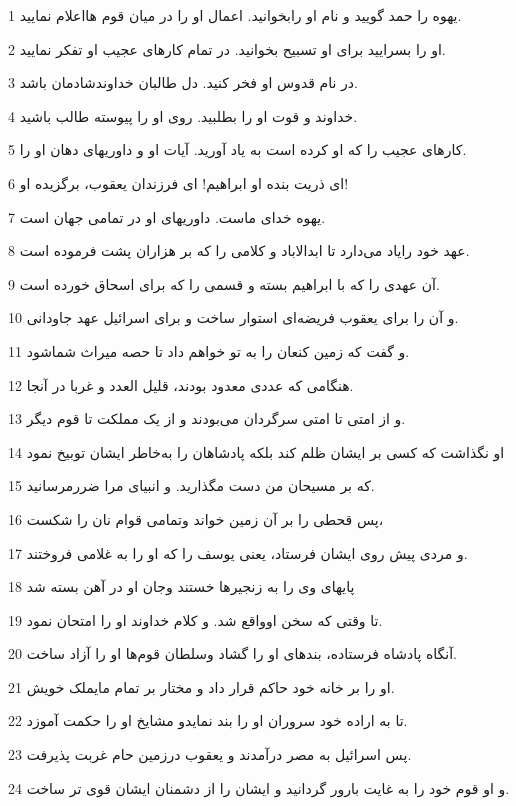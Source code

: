 \par 1 یهوه را حمد گویید و نام او رابخوانید. اعمال او را در میان قوم هااعلام نمایید.
\par 2 او را بسرایید برای او تسبیح بخوانید. در تمام کارهای عجیب او تفکر نمایید.
\par 3 در نام قدوس او فخر کنید. دل طالبان خداوندشادمان باشد.
\par 4 خداوند و قوت او را بطلبید. روی او را پیوسته طالب باشید.
\par 5 کارهای عجیب را که او کرده است به یاد آورید. آیات او و داوریهای دهان او را.
\par 6 ‌ای ذریت بنده او ابراهیم! ای فرزندان یعقوب، برگزیده او!
\par 7 یهوه خدای ماست. داوریهای او در تمامی جهان است.
\par 8 عهد خود رایاد می‌دارد تا ابدالاباد و کلامی را که بر هزاران پشت فرموده است.
\par 9 آن عهدی را که با ابراهیم بسته و قسمی را که برای اسحاق خورده است.
\par 10 و آن را برای یعقوب فریضه‌ای استوار ساخت و برای اسرائیل عهد جاودانی.
\par 11 و گفت که زمین کنعان را به تو خواهم داد تا حصه میراث شماشود.
\par 12 هنگامی که عددی معدود بودند، قلیل العدد و غربا در آنجا.
\par 13 و از امتی تا امتی سرگردان می‌بودند و از یک مملکت تا قوم دیگر.
\par 14 او نگذاشت که کسی بر ایشان ظلم کند بلکه پادشاهان را به‌خاطر ایشان توبیخ نمود
\par 15 که بر مسیحان من دست مگذارید. و انبیای مرا ضررمرسانید.
\par 16 پس قحطی را بر آن زمین خواند وتمامی قوام نان را شکست،
\par 17 و مردی پیش روی ایشان فرستاد، یعنی یوسف را که او را به غلامی فروختند.
\par 18 پایهای وی را به زنجیرها خستند وجان او در آهن بسته شد
\par 19 تا وقتی که سخن اوواقع شد. و کلام خداوند او را امتحان نمود.
\par 20 آنگاه پادشاه فرستاده، بندهای او را گشاد وسلطان قوم‌ها او را آزاد ساخت.
\par 21 او را بر خانه خود حاکم قرار داد و مختار بر تمام مایملک خویش.
\par 22 تا به اراده خود سروران او را بند نمایدو مشایخ او را حکمت آموزد.
\par 23 پس اسرائیل به مصر درآمدند و یعقوب درزمین حام غربت پذیرفت.
\par 24 و او قوم خود را به غایت بارور گردانید و ایشان را از دشمنان ایشان قوی تر ساخت.

